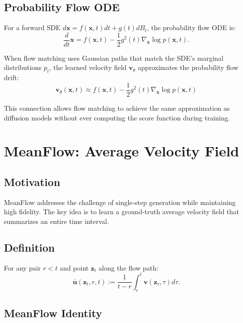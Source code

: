 \subsection{Probability Flow ODE}

For a forward SDE $d\mathbf{x} = f(\mathbf{x},t)dt + g(t)dB_t$, the probability flow ODE is:
\begin{equation}
    \frac{d}{dt} \mathbf{x} = f(\mathbf{x},t) - \frac{1}{2}g^2(t)\nabla_{\mathbf{x}} \log p(\mathbf{x},t).
\end{equation}

When flow matching uses Gaussian paths that match the SDE's marginal distributions $p_t$, the learned velocity field $\mathbf{v}_\theta$ approximates the probability flow drift:
\begin{equation}
    \mathbf{v}_\theta(\mathbf{x},t) \approx f(\mathbf{x},t) - \frac{1}{2}g^2(t)\nabla_{\mathbf{x}} \log p(\mathbf{x},t)
\end{equation}

This connection allows flow matching to achieve the same approximation as diffusion models without ever computing the score function during training.

\section{MeanFlow: Average Velocity Field}

\subsection{Motivation}

MeanFlow addresses the challenge of single-step generation while maintaining high fidelity. The key idea is to learn a ground-truth average velocity field that summarizes an entire time interval.

\subsection{Definition}

For any pair $r < t$ and point $\mathbf{z}_t$ along the flow path:
\begin{equation}
    \overline{\mathbf{u}}(\mathbf{z}_t, r, t) := \frac{1}{t-r} \int_r^t \mathbf{v}(\mathbf{z}_\tau, \tau) d\tau.
\end{equation}

\subsection{MeanFlow Identity}

